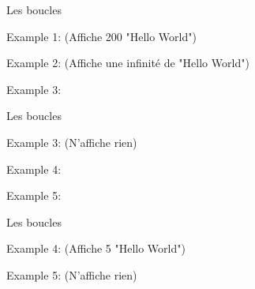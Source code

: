 \documentclass{beamer}
\begin{document}
\begin{darkframes}


	
	\begin{frame}{Les boucles}
		\begin{center}
			\begin{minipage}[t]{0.8\linewidth}
				Example 1: (\alert{Affiche 200 "Hello World"})
				\forExmpOne
			\end{minipage}
			\begin{minipage}[t]{0.8\linewidth}
				Example 2: (\alert{Affiche une infinité de "Hello World"})
				\forExmpTwo
			\end{minipage}
			\begin{minipage}[t]{0.8\linewidth}
				Example 3:
				\forExmpThree
			\end{minipage}
		\end{center}
	\end{frame}
	
	\begin{frame}{Les boucles}	
		\begin{minipage}[t]{0.8\linewidth}
			Example 3: (\alert{N'affiche rien})
			\forExmpThree
		\end{minipage}
		\begin{minipage}[t]{0.8\linewidth}
			Example 4:
			\forExmpFour
		\end{minipage}
		\begin{minipage}[t]{0.8\linewidth}
			Example 5:
			\forExmpFive
		\end{minipage}
	\end{frame}

	\begin{frame}{Les boucles}
		\begin{minipage}[t]{0.8\linewidth}
			Example 4:  (\alert{Affiche 5 "Hello World"})
			\forExmpFour
		\end{minipage}
		\begin{minipage}[t]{0.8\linewidth}
			Example 5: (\alert{N'affiche rien})
			\forExmpFive
		\end{minipage}
	\end{frame}


\end{darkframes}
\end{document}
